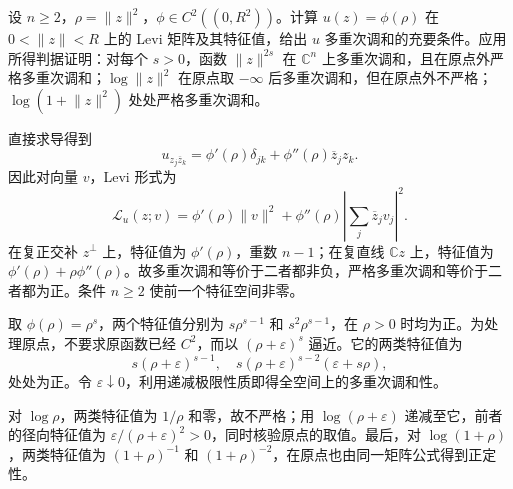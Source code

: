 \begin{exercise}\label{b3:ex:29-3}
设 \(n\ge2\)，\(\rho=\lVert z\rVert^2\)，\(\phi\in C^2((0,R^2))\)。计算 \(u(z)=\phi(\rho)\) 在 \(0<\lVert z\rVert<R\) 上的 Levi 矩阵及其特征值，给出 \(u\) 多重次调和的充要条件。应用所得判据证明：对每个 \(s>0\)，函数 \(\lVert z\rVert^{2s}\) 在 \(\mathbb C^n\) 上多重次调和，且在原点外严格多重次调和；\(\log\lVert z\rVert^2\) 在原点取 \(-\infty\) 后多重次调和，但在原点外不严格；\(\log(1+\lVert z\rVert^2)\) 处处严格多重次调和。
\end{exercise}
\begin{solution}
直接求导得到
\[
 u_{z_j\overline z_k}=\phi'(\rho)\delta_{jk}
          +\phi''(\rho)\overline z_j z_k.
\]
因此对向量 \(v\)，Levi 形式为
\[
 \mathcal L_u(z;v)=\phi'(\rho)\lVert v\rVert^2
          +\phi''(\rho)\left|\sum_j\overline z_jv_j\right|^2.
\]
在复正交补 \(z^\perp\) 上，特征值为 \(\phi'(\rho)\)，重数 \(n-1\)；在复直线 \(\mathbb Cz\) 上，特征值为 \(\phi'(\rho)+\rho\phi''(\rho)\)。故多重次调和等价于二者都非负，严格多重次调和等价于二者都为正。条件 \(n\ge2\) 使前一个特征空间非零。

取 \(\phi(\rho)=\rho^s\)，两个特征值分别为 \(s\rho^{s-1}\) 和 \(s^2\rho^{s-1}\)，在 \(\rho>0\) 时均为正。为处理原点，不要求原函数已经 \(C^2\)，而以 \((\rho+\varepsilon)^s\) 逼近。它的两类特征值为
\[
 s(\rho+\varepsilon)^{s-1},\quad
 s(\rho+\varepsilon)^{s-2}(\varepsilon+s\rho),
\]
处处为正。令 \(\varepsilon\downarrow0\)，利用递减极限性质即得全空间上的多重次调和性。

对 \(\log\rho\)，两类特征值为 \(1/\rho\) 和零，故不严格；用 \(\log(\rho+\varepsilon)\) 递减至它，前者的径向特征值为 \(\varepsilon/(\rho+\varepsilon)^2>0\)，同时核验原点的取值。最后，对 \(\log(1+\rho)\)，两类特征值为 \((1+\rho)^{-1}\) 和 \((1+\rho)^{-2}\)，在原点也由同一矩阵公式得到正定性。
\end{solution}


